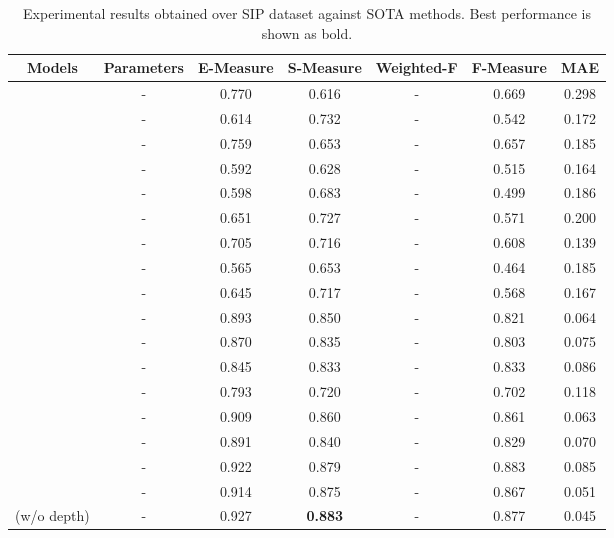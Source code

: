 \documentclass{article}
\begin{document}
\begin{table*}[tbp!h]
\caption{Experimental results obtained over SIP dataset against SOTA methods. Best performance is shown as bold.}
\captionsetup{justification=centering}
\begin{center}
\begin{tabular}[width=\columnwidth]{l||c|ccccc}

\hline
\multicolumn{1}{c||}{Models}   & Parameters&  E-Measure  & S-Measure  & Weighted-F  & F-Measure  & MAE  \\ \hline \hline

\cite{cheng2014depth}        & - & 0.770 & 0.616 & - & 0.669 & 0.298 \\ 
\cite{ju2014depth}           & - & 0.614 & 0.732 & - & 0.542 & 0.172 \\ 
\cite{ren2015exploiting}     & - & 0.759 & 0.653 & - & 0.657 & 0.185 \\ 
\cite{guo2016salient}        & - & 0.592 & 0.628 & - & 0.515 & 0.164 \\ 
\cite{cong2016saliency}      & - & 0.598 & 0.683 & - & 0.499 & 0.186 \\ 
\cite{feng2016local}         & - & 0.651 & 0.727 & - & 0.571 & 0.200 \\ 
\cite{han2017cnns}           & - & 0.705 & 0.716 & - & 0.608 & 0.139 \\ 
\cite{qu2017rgbd}            & - & 0.565 & 0.653 & - & 0.464 & 0.185 \\ 
\cite{song2017depth}         & - & 0.645 & 0.717 & - & 0.568 & 0.167 \\ 
\cite{zhao2019contrast}      & - & 0.893 & 0.850 & - & 0.821 & 0.064 \\ 
\cite{chen2019three}         & - & 0.870 & 0.835 & - & 0.803 & 0.075 \\ 
\cite{chen2019multi}         & - & 0.845 & 0.833 & - & 0.833 & 0.086 \\ 
\cite{wang2019adaptive}      & - & 0.793 & 0.720 & - & 0.702 & 0.118 \\ 
\cite{fan2020rethinking}     & - & 0.909 & 0.860 & - & 0.861 & 0.063 \\  
\cite{liu2020cross}          & - & 0.891 & 0.840 & - & 0.829 & 0.070 \\ 
\cite{fan2020bbs}            & - & 0.922 & 0.879 & - & 0.883 & 0.085 \\ 
\cite{zhang2020uc}           & - & 0.914 & 0.875 & - & 0.867 & 0.051 \\ 
\cite{zhang2020uncertainty} (w/o depth) & - & 0.927 & \textbf{0.883} & - & 0.877 & 0.045 \\

\end{tabular}
\end{center}
\end{table*}
\end{document}
